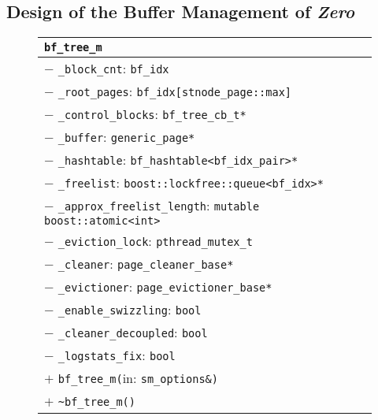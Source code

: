 \subsection{Design of the Buffer Management of \emph{Zero}} \label{subsec:zerodesign}

\begin{@empty}
	\begin{figure}[ht!]
		\centering
		\scriptsize
		\setlength{\fboxsep}{0pt}
		\colorbox{listingsbackground}{\begin{tabularx}{\textwidth}{|X|}
			\hline
			\texttt{\textbf{bf\_tree\_m}}																																	\\	\hline
			$-$ \texttt{\_block\_cnt}: \texttt{bf\_idx}																														\\
			$-$ \texttt{\_root\_pages}: \texttt{bf\_idx[stnode\_page::max]}																										\\
			$-$ \texttt{\_control\_blocks}: \texttt{bf\_tree\_cb\_t*}																												\\
			$-$ \texttt{\_buffer}: \texttt{generic\_page*}																														\\
			$-$ \texttt{\_hashtable}: \texttt{bf\_hashtable<bf\_idx\_pair>*}																										\\
			$-$ \texttt{\_freelist}: \texttt{boost::lockfree::queue<bf\_idx>*}																										\\
			$-$ \texttt{\_approx\_freelist\_length}: \texttt{mutable boost::atomic<int>}																								\\
			$-$ \texttt{\_eviction\_lock}: \texttt{pthread\_mutex\_t}																											\\
			$-$ \texttt{\_cleaner}: \texttt{page\_cleaner\_base*}																												\\
			$-$ \texttt{\_evictioner}: \texttt{page\_evictioner\_base*}																											\\
			$-$ \texttt{\_enable\_swizzling}: \texttt{bool}																													\\
			$-$ \texttt{\_cleaner\_decoupled}: \texttt{bool}																													\\
			$-$ \texttt{\_logstats\_fix}: \texttt{bool}																														\\	\hline
			$+$ \texttt{bf\_tree\_m(}in: \texttt{sm\_options\&)}																												\\
			$+$ \texttt{\textasciitilde bf\_tree\_m()}																														\\

\end{tabularx}}
\end{figure}
\end{@empty}
